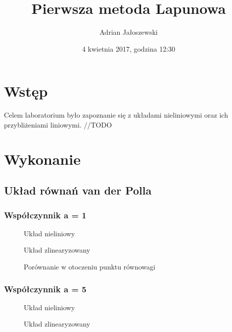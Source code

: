 \documentclass[a4paper, 10pt]{article}
\title{Pierwsza metoda Lapunowa}
\author{Adrian Jałoszewski}
\date{4 kwietnia 2017, godzina 12:30}
\begin{document}
	\maketitle
	\section{Wstęp}
		Celem laboratorium było zapoznanie się z układami nieliniowymi oraz ich przybliżeniami liniowymi. //TODO
	\section{Wykonanie}
		\subsection{Układ równań van der Polla}
			\subsubsection{Współczynnik a = 1}
				\begin{figure}[H]
					\centering
					\def \svgwidth{0.75\columnwidth}
					
					\caption{Układ nieliniowy}
				\end{figure}\noindent


				\begin{figure}[H]
					\centering
					\def \svgwidth{0.75\columnwidth}
					
					\caption{Układ zlinearyzowany}
				\end{figure}\noindent

				\begin{figure}[H]
					\centering
					\def \svgwidth{0.75\columnwidth}
					
					\caption{Porównanie w otoczeniu punktu równowagi}
				\end{figure}\noindent

			\subsubsection{Współczynnik a = 5}
				\begin{figure}[H]
					\centering
					\def \svgwidth{0.75\columnwidth}
					
					\caption{Układ nieliniowy}
				\end{figure}\noindent


				\begin{figure}[H]
					\centering
					\def \svgwidth{0.75\columnwidth}
					
					\caption{Układ zlinearyzowany}
				\end{figure}\noindent
\end{document}

